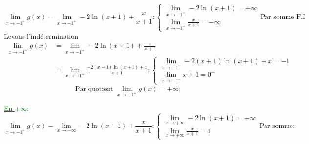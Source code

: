 \documentclass[12pt]{article}
\begin{document}
\begin{enumerate}
\begin{enumerate}
\[
\lim_{x \to -1^{+}}g(x)=\lim_{x \to -1^{+}}-2\ln(x+1)+\frac{x}{x+1}:
\begin{cases}
\lim_{x \to -1^{+}}-2\ln(x+1)=+\infty\\
\lim_{x \to -1^{+}}\frac{x}{x+1}=-\infty
\end{cases}
\text{Par somme F.I}
\]
Levons l'indétermination
\begin{align*}
\lim_{x \to -1^{+}}g(x)&=\lim_{x \to -1^{+}}-2\ln(x+1)+\frac{x}{x+1}\\
&=\lim_{x \to -1^{+}}\frac{-2(x+1)\ln(x+1)+x}{x+1}:
\begin{cases}
\lim_{x \to -1^{+}}-2(x+1)\ln(x+1)+x=-1\\
\lim_{x \to -1^{+}}x+1=0^{-}
\end{cases}
\end{align*}
\[\text{Par quotient }\lim_{x \to -1^{+}}g(x)=+\infty\]
		\begin{center}
			\textcolor{green}{}
		\end{center}		
\textcolor{green}{\underline{En $+\infty$}:}
\[
\lim_{x \to -1^{+}}g(x)=\lim_{x \to +\infty}-2\ln(x+1)+\frac{x}{x+1}:
\begin{cases}
\lim_{x \to +\infty}-2\ln(x+1)=-\infty\\
\lim_{x \to +\infty}\frac{x}{x+1}=1
\end{cases}
\text{Par somme:}
\]
		\begin{center}
			\textcolor{green}{}
		\end{center}
\end{enumerate}
\end{enumerate}
\end{document}
